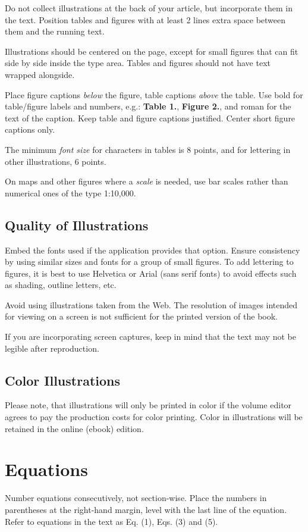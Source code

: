 \documentclass{IOS-Book-Article}
\begin{document}
Do not collect illustrations at the back of your article, but incorporate them in the
text. Position tables and figures with at least 2 lines
extra space between them and the running text.

Illustrations should be centered on the page, except for small figures that can fit
side by side inside the type area. Tables and figures should not have text wrapped
alongside.

Place figure captions \textit{below} the figure, table captions \textit{above} the table.
Use bold for table/figure labels and numbers, e.g.: \textbf{Table 1.}, \textbf{Figure 2.},
and roman for the text of the caption. Keep table and figure captions justified. Center
short figure captions only.

The minimum \textit{font size} for characters in tables is 8 points, and for lettering in other
illustrations, 6 points.

On maps and other figures where a \textit{scale} is needed, use bar scales rather than
numerical ones of the type 1:10,000.

\subsection{Quality of Illustrations}
Embed the fonts used if the application provides that option.
Ensure consistency by using similar sizes and fonts for a group of small figures.
To add lettering to figures, it is best to use Helvetica or Arial (sans serif fonts)
to avoid effects such as shading, outline letters, etc.

 Avoid using illustrations
taken from the Web. The resolution of images intended for viewing on a screen is
not sufficient for the printed version of the book.

If you are incorporating screen captures, keep in mind that the text may not be
legible after reproduction.

\subsection{Color Illustrations}
Please note, that illustrations will only be printed in color if the volume editor agrees to
pay the production costs for color printing. Color in illustrations will be retained
in the online (ebook) edition.


\section{Equations}
Number equations consecutively, not section-wise. Place the numbers in parentheses at
the right-hand margin, level with the last line of the equation. Refer to equations in the
text as Eq. (1), Eqs. (3) and (5).
\end{document}
